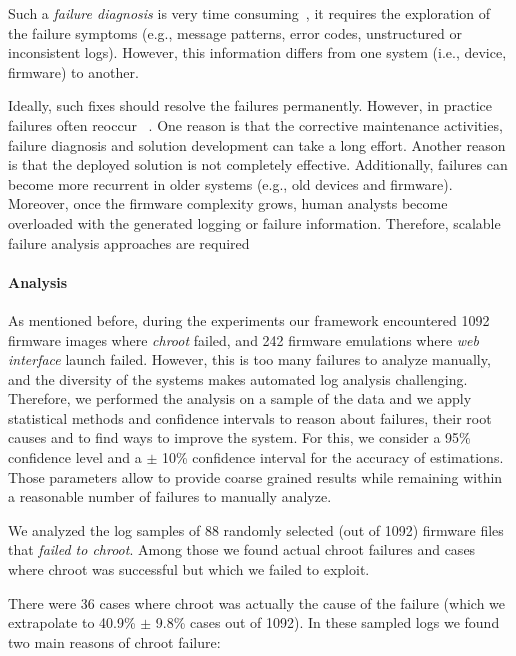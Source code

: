 \documentclass[conference]{./templates/ndss/IEEEtran}
\newcounter{t0d0_counter}
\newcounter{pr00f_counter}
\newcommand{\CountFirmwareEmulatedNOTOK}{1092}
\newcommand{\CountFirmwareEmulatedWebServerNOTStarted}{242}
\newcommand{\EmulatedNOTOKRandSampl}{88}
\newcommand{\EmulatedNOTOKRandSamplChrootFail}{36}
\newcommand{\EmulatedNOTOKRandSamplChrootFailPct}{40.9\%}
\newcommand{\EmulatedNOTOKRandSamplChrootFailConfInt}{9.8\%}
\begin{document}
Such a \emph{failure diagnosis} is very time consuming~\cite{li2010cost}, 
it requires the exploration of the failure symptoms 
(e.g., message patterns, error codes, unstructured or inconsistent logs). 
However, this information differs from one system (i.e., device, firmware) 
to another. 

Ideally, such fixes should resolve the failures permanently.
However, in practice failures often reoccur ~\cite{lee2000diagnosing}.
One reason is that the corrective maintenance activities, failure diagnosis 
and solution development can take a long effort. Another reason is that 
the deployed solution is not completely effective. 
Additionally, failures can become more recurrent in older systems 
(e.g., old devices and firmware). Moreover, once the firmware complexity grows, human analysts become
overloaded with the generated logging or failure information.
Therefore, scalable failure analysis approaches are required 


\paragraph{Analysis}

As mentioned before, during the experiments our framework encountered 
\CountFirmwareEmulatedNOTOK{} firmware images where \emph{chroot} failed, and 
\CountFirmwareEmulatedWebServerNOTStarted{} firmware emulations where 
\emph{web interface} launch failed. 
However, this is too many failures to analyze manually, and the 
diversity of the systems makes automated log analysis challenging.
Therefore, we performed the analysis on a sample of the data and 
we apply statistical methods and confidence intervals to reason 
about failures, their root causes and to find ways to improve the system.
    For this, we consider a 95\% confidence level and a $\pm$ 10\% confidence 
interval for the accuracy of estimations. Those parameters allow to provide coarse grained 
results while remaining within a reasonable number of failures to manually analyze. 


We analyzed the log samples of \EmulatedNOTOKRandSampl{} randomly
selected (out of \CountFirmwareEmulatedNOTOK{}) firmware files that
\emph{failed to chroot}. Among those we found actual chroot failures
and cases where chroot was successful but which we failed to exploit.

    There were \EmulatedNOTOKRandSamplChrootFail{} cases where chroot 
was actually the cause of the failure (which we extrapolate to \EmulatedNOTOKRandSamplChrootFailPct{} 
$\pm$ \EmulatedNOTOKRandSamplChrootFailConfInt{} cases out of \CountFirmwareEmulatedNOTOK{}). 
In these sampled logs we found two main reasons of chroot failure:
\end{document}
